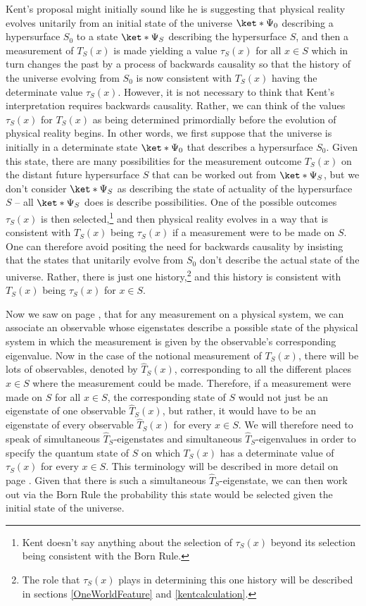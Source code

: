 \documentclass[12pt]{report}
\begin{document}
Kent's proposal might initially sound like he is suggesting that physical reality evolves unitarily from an initial state of the universe $\ket*{\Psi_0}$\label{Psi0PsiSdef} describing a hypersurface $S_0$ to a state $\ket*{\Psi_S}$ describing the hypersurface $S$, and then a measurement of $T_S(x)$ is made yielding a value $\tau_S(x)$ for all $x\in S$ which in turn  changes the past by a process of backwards causality so that the history of the universe evolving from $S_0$ is now consistent with $T_S(x)$ having the determinate value $\tau_S(x)$. However, it is not necessary to think that Kent's interpretation requires backwards causality. Rather, we can think of the values $\tau_S(x)$ for $T_S(x)$ as being determined primordially before the evolution of physical reality begins. In other words, we first suppose that the universe is initially in a determinate state $\ket*{\Psi_0}$ that describes a hypersurface $S_0$. Given this state, there are many possibilities for the measurement outcome $T_S(x)$ on the distant future hypersurface $S$ that can be worked out from $\ket*{\Psi_S}$, but we don't consider $\ket*{\Psi_S}$ as describing the state of actuality of the hypersurface $S$ -- all $\ket*{\Psi_S}$ does is describe possibilities. One of the possible outcomes $\tau_S(x)$ is then selected,\footnote{Kent doesn't say anything about the selection of $\tau_S(x)$ beyond its selection being consistent with the Born Rule.} and then physical reality evolves in a way that is consistent with $T_S(x)$ being $\tau_S(x)$ if a measurement were to be made on $S$. One can therefore avoid positing the need for backwards causality by insisting that the states that unitarily evolve from $S_0$ don't describe the actual state of the universe. Rather, there is just one history,\footnote{The role that $\tau_S(x)$ plays in determining this one history will be described in sections \ref{OneWorldFeature} and  \ref{kentcalculation}.} and this history is consistent with $T_S(x)$ being $\tau_S(x)$ for $x\in S$.

Now we saw on page \pageref{eigendef}, that for any measurement on a physical system, we can associate an observable whose eigenstates describe a possible state of the physical system in which the measurement is given by the observable's corresponding eigenvalue. Now in the case of the notional measurement of $T_S(x)$, there will be lots of observables, denoted by $\hat{T}_S(x)$, corresponding to all the different places $x\in S$ where the measurement could be made. Therefore, if a measurement were made on $S$ for all $x\in S$, the corresponding state of $S$ would not just be an eigenstate of one observable $\hat{T}_S(x)$,\label{firstHatTS} 
but rather, it would have to be an eigenstate of every observable $\hat{T}_S(x)$ for every $x\in S$. We will therefore need to speak of simultaneous $\hat{T}_S$-eigenstates and simultaneous $\hat{T}_S$-eigenvalues in order to specify the quantum state of $S$ on which $T_S(x)$ has a determinate value of $\tau_S(x)$ for every $x\in S$. This terminology will be described in more detail on page \pageref{simultaneous}.  Given that there is such a simultaneous $\hat{T}_S$-eigenstate, we can then work out via the Born Rule the probability this state would be selected given the initial state of the universe.
\end{document}
